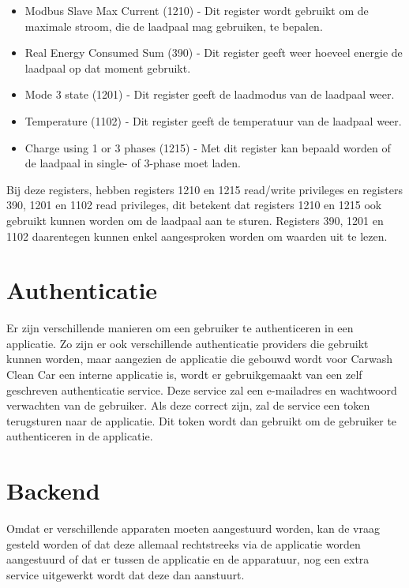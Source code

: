 \begin{itemize}
    \item Modbus Slave Max Current (1210) - Dit register wordt gebruikt om de maximale stroom, die de laadpaal mag gebruiken, te bepalen.
    \item Real Energy Consumed Sum (390) - Dit register geeft weer hoeveel energie de laadpaal op dat moment gebruikt.
    \item Mode 3 state (1201) - Dit register geeft de laadmodus van de laadpaal weer.
    \item Temperature (1102) - Dit register geeft de temperatuur van de laadpaal weer.
    \item Charge using 1 or 3 phases (1215) - Met dit register kan bepaald worden of de laadpaal in single- of 3-phase moet laden.
\end{itemize}

Bij deze registers, hebben registers 1210 en 1215 read/write privileges en registers 390, 1201 en 1102 read privileges, dit betekent dat registers 1210 en 1215 ook gebruikt kunnen worden om de laadpaal aan te sturen. Registers 390, 1201 en 1102 daarentegen kunnen enkel aangesproken worden om waarden uit te lezen.

\section{Authenticatie}
\label{sec:stand-van-zaken-authenticatie}

Er zijn verschillende manieren om een gebruiker te authenticeren in een applicatie. Zo zijn er ook verschillende authenticatie providers die gebruikt kunnen worden, maar aangezien de applicatie die gebouwd wordt voor Carwash Clean Car een interne applicatie is, wordt er gebruikgemaakt van een zelf geschreven authenticatie service. Deze service zal een e-mailadres en wachtwoord verwachten van de gebruiker. Als deze correct zijn, zal de service een token terugsturen naar de applicatie. Dit token wordt dan gebruikt om de gebruiker te authenticeren in de applicatie.

\section{Backend}
\label{sec:stand-van-zaken-backend}

Omdat er verschillende apparaten moeten aangestuurd worden, kan de vraag gesteld worden of dat deze allemaal rechtstreeks via de applicatie worden aangestuurd of dat er tussen de applicatie en de apparatuur, nog een extra service uitgewerkt wordt dat deze dan aanstuurt.\\

